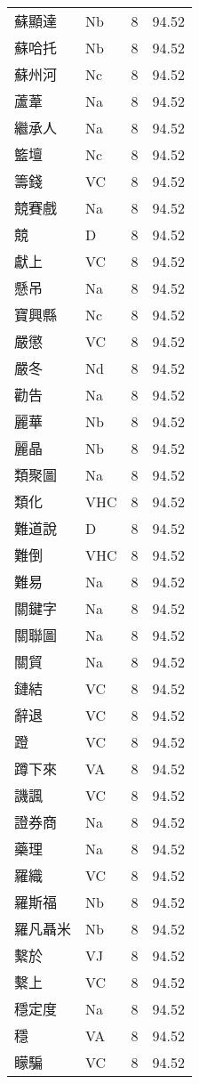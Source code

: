 \documentclass[twocolumn]{book}
\begin{document}
\begin{supertabular}{llrr}
蘇顯達 & Nb & 8 &  94.52\\
蘇哈托 & Nb & 8 &  94.52\\
蘇州河 & Nc & 8 &  94.52\\
蘆葦 & Na & 8 &  94.52\\
繼承人 & Na & 8 &  94.52\\
籃壇 & Nc & 8 &  94.52\\
籌錢 & VC & 8 &  94.52\\
競賽戲 & Na & 8 &  94.52\\
競 & D & 8 &  94.52\\
獻上 & VC & 8 &  94.52\\
懸吊 & Na & 8 &  94.52\\
寶興縣 & Nc & 8 &  94.52\\
嚴懲 & VC & 8 &  94.52\\
嚴冬 & Nd & 8 &  94.52\\
勸告 & Na & 8 &  94.52\\
麗華 & Nb & 8 &  94.52\\
麗晶 & Nb & 8 &  94.52\\
類聚圖 & Na & 8 &  94.52\\
類化 & VHC & 8 &  94.52\\
難道說 & D & 8 &  94.52\\
難倒 & VHC & 8 &  94.52\\
難易 & Na & 8 &  94.52\\
關鍵字 & Na & 8 &  94.52\\
關聯圖 & Na & 8 &  94.52\\
關貿 & Na & 8 &  94.52\\
鏈結 & VC & 8 &  94.52\\
辭退 & VC & 8 &  94.52\\
蹬 & VC & 8 &  94.52\\
蹲下來 & VA & 8 &  94.52\\
譏諷 & VC & 8 &  94.52\\
證券商 & Na & 8 &  94.52\\
藥理 & Na & 8 &  94.52\\
羅織 & VC & 8 &  94.52\\
羅斯福 & Nb & 8 &  94.52\\
羅凡聶米 & Nb & 8 &  94.52\\
繫於 & VJ & 8 &  94.52\\
繫上 & VC & 8 &  94.52\\
穩定度 & Na & 8 &  94.52\\
穩 & VA & 8 &  94.52\\
矇騙 & VC & 8 &  94.52\\

\end{supertabular}
\end{document}
